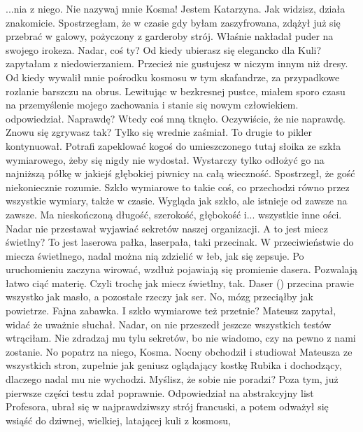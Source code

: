 \begin{dialogue}
...nia z niego. \dm{} Nie nazywaj mnie Kosma! Jestem Katarzyna.
\ds{} Jak widzisz, działa znakomicie. \dm{} Spostrzegłam, że w czasie gdy byłam zaszyfrowana, zdążył już się przebrać w galowy, pożyczony z garderoby strój. 
Właśnie nakładał puder na swojego irokeza.
\ds{} Nadar, coś ty? Od kiedy ubierasz się elegancko dla Kuli? \dm{} zapytałam z niedowierzaniem. \dm{} Przecież nie gustujesz w niczym innym niż dresy.
\ds{} Od kiedy wywalił mnie pośrodku kosmosu w tym skafandrze, za przypadkowe rozlanie barszczu na obrus. 
Lewitując w bezkresnej pustce, miałem sporo czasu na przemyślenie mojego zachowania i stanie się nowym człowiekiem. \dm{} odpowiedział.
\ds{} Naprawdę? \dm{} Wtedy coś mną tknęło. \dm{} Oczywiście, że nie naprawdę. Znowu się zgrywasz tak? \dm{} Tylko się wrednie zaśmiał.
\ds{} To drugie to pikler \dm{} kontynuował. \dm{} 
Potrafi zapeklować kogoś do umieszczonego tutaj słoika ze szkła wymiarowego, żeby się nigdy nie wydostał.
Wystarczy tylko odłożyć go na najniższą półkę w jakiejś głębokiej piwnicy na całą wieczność.
\dm{} Spostrzegł, że gość niekoniecznie rozumie. \dm{}
Szkło wymiarowe to takie coś, co przechodzi równo przez wszystkie wymiary, także w czasie. 
Wygląda jak szkło, ale istnieje od zawsze na zawsze. 
Ma nieskończoną długość, szerokość, głębokość i... wszystkie inne ości. \dm{}
Nadar nie przestawał wyjawiać sekretów naszej organizacji.
\ds{} A to jest miecz świetlny?
\ds{} To jest laserowa pałka, laserpała, taki przecinak. W przeciwieństwie do miecza świetlnego, nadal można nią zdzielić w łeb, jak się zepsuje.
Po uruchomieniu zaczyna wirować, wzdłuż pojawiają się promienie dasera. Pozwalają łatwo ciąć materię. Czyli trochę jak miecz świetlny, tak.
Daser () przecina prawie wszystko jak masło, a pozostałe rzeczy jak ser. 
No, mózg przeciąłby jak powietrze.
Fajna zabawka.
\ds{} I szkło wymiarowe też przetnie? \dm{} Mateusz zapytał, widać że uważnie słuchał.
\ds{} Nadar, on nie przeszedł jeszcze wszystkich testów \dm{} wtrąciłam. \dm{} Nie zdradzaj mu tylu sekretów, bo nie wiadomo, czy na pewno z nami zostanie.
\ds{} No popatrz na niego, Kosma. \dm{} Nocny obchodził i studiował Mateusza ze wszystkich stron, zupełnie jak geniusz oglądający
kostkę Rubika i dochodzący, dlaczego nadal mu nie wychodzi. \dm{} Myślisz, że sobie nie poradzi? Poza tym, już pierwsze części testu zdał poprawnie. 
Odpowiedział na abstrakcyjny list Profesora, ubrał się w najprawdziwszy strój francuski, a potem odważył się wsiąść do dziwnej, wielkiej, latającej kuli z kosmosu,

\end{dialogue}
